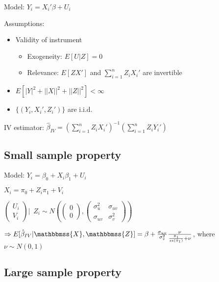 \documentclass[10pt,landscape]{article}
\begin{document}
\begin{multicols}{3}
Model: $Y_i = X_i'\beta + U_i$

Assumptions: 
\begin{itemize}
  \item Validity of instrument
  \begin{itemize}
    \item Exogeneity: $E[U | Z] = 0$
    \item Relevance: $E[Z X']$ and $\sum_{i=1}^n Z_i X_i'$ are invertible
  \end{itemize}
  \item $E[|Y|^2 + ||X||^2 + ||Z||^2] < \infty$
  \item $\{ (Y_i, X_i', Z_i') \}$ are i.i.d.
\end{itemize}

IV estimator: $\hat{\beta}_{IV} = (\sum_{i=1}^n Z_i X_i')^{-1} (\sum_{i=1}^n Z_i Y_i')$

\subsection{Small sample property}
Model: $Y_i = \beta_0 + X_i \beta_1 + U_i$

\hspace{24pt} $X_i = \pi_0 + Z_i \pi_1 + V_i$

\vspace{3pt}
\hspace{24pt} $
  \begin{pmatrix}
    U_i \\ 
    V_i
  \end{pmatrix} \bigg| \enspace Z_i \sim N \left( 
    \begin{pmatrix}
      0 \\ 
      0
    \end{pmatrix}, 
    \begin{pmatrix}
      \sigma_u^2 & \sigma_{uv} \\ 
      \sigma_{uv} & \sigma_v^2
    \end{pmatrix} \right)
$
\vspace{3pt}

$\Rightarrow E[\hat{\beta}_{IV} | \mathbbmss{X}, \mathbbmss{Z}] = \beta + \frac{\sigma_{uv}}{\sigma_v^2} \frac{\nu}{\frac{\hat{\pi}_1}{se(\hat{\pi}_1)} + \nu}$, where $\nu \sim N(0, 1)$

\subsection{Large sample property}


\end{multicols}
\end{document}
